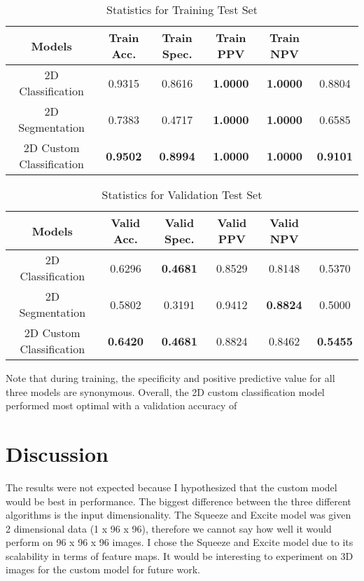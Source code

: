 \documentclass [12pt, letterpaper] {article}
\begin{document}
\begin{table}[h!]
\centering
\small
\begin{tabular}{ c c c c c c } 
 \hline
 Models & Train Acc. & Train Spec. & Train PPV & Train NPV\\  [0.5ex] 
 \hline
 2D Classification & 0.9315 & 0.8616 & \textbf{1.0000} & \textbf{1.0000} & 0.8804 \\
 2D Segmentation  & 0.7383 & 0.4717 & \textbf{1.0000} & \textbf{1.0000} & 0.6585 \\
 2D Custom Classification & \textbf{0.9502} & \textbf{0.8994} & \textbf{1.0000} & \textbf{1.0000} & \textbf{0.9101}\\

 \hline
\end{tabular}

\caption{Statistics for Training Test Set}
\label{table:data}
\end{table}

\begin{table}[h!]
\centering
\small
\begin{tabular}{ c c c c c c } 
 \hline
 Models & Valid Acc. & Valid Spec. & Valid PPV & Valid NPV \\  [0.5ex] 
 \hline
 2D Classification & 0.6296 & \textbf{0.4681} & 0.8529 & 0.8148 & 0.5370 \\
 2D Segmentation & 0.5802 & 0.3191 & 0.9412 & \textbf{0.8824} & 0.5000 \\
 2D Custom Classification & \textbf{0.6420} & \textbf{0.4681} & 0.8824 & 0.8462 & \textbf{0.5455}\\

\hline
\end{tabular}

\caption{Statistics for Validation Test Set}
\label{table:data}
\end{table}

Note that during training, the specificity and positive predictive value for all three models are synonymous. Overall, the 2D custom classification model performed most optimal with a validation accuracy of 

\section{Discussion}
The results were not expected because I hypothesized that the custom model would be best in performance. The biggest difference between the three different algorithms is the input dimensionality. The Squeeze and Excite model was given 2 dimensional data (1 x 96 x 96), therefore we cannot say how well it would perform on 96 x 96 x 96 images. I chose the Squeeze and Excite model due to its scalability in terms of feature maps. It would be interesting to experiment on 3D images for the custom model for future work. 
\end{document}
